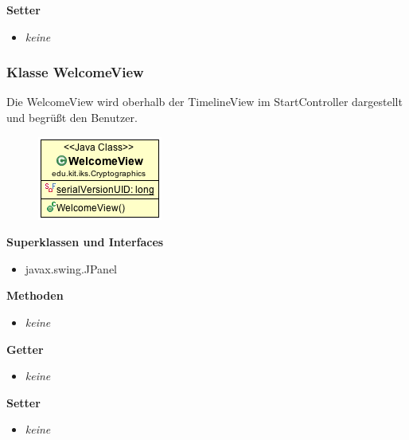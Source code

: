 \documentclass{article}
\begin{document}
      \textbf{Setter}
      \begin{itemize}
        \item \textit{keine}
      \end{itemize}

    \subsubsection{Klasse WelcomeView}
      Die WelcomeView wird oberhalb der TimelineView im StartController dargestellt und begrüßt den Benutzer.
      \begin{figure}[H]
        \centering
        \includegraphics[width=\textwidth]{resources/edu-kit-iks-Cryptographics-WelcomeView}
      \end{figure}

      \textbf{Superklassen und Interfaces}
      \begin{itemize}
        \item javax.swing.JPanel
      \end{itemize}
      
      \textbf{Methoden}
      \begin{itemize}
        \item \textit{keine}
      \end{itemize}

      \textbf{Getter}
      \begin{itemize}
        \item \textit{keine}
      \end{itemize}

      \textbf{Setter}
      \begin{itemize}
        \item \textit{keine}
      \end{itemize}
\end{document}

